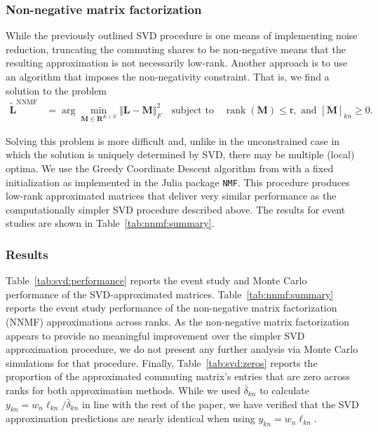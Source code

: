 \documentclass[11pt]{article}
\theoremstyle{definition}
\begin{document}
\subsubsection{Non-negative matrix factorization}\label{sec:appendix:nnmf}

While the previously outlined SVD procedure is one means of implementing noise reduction,
truncating the commuting shares to be non-negative means that the resulting approximation is not necessarily low-rank.
Another approach is to use an algorithm that imposes the non-negativity constraint.
That is, we find a solution to the problem 
\begin{equation}
\begin{split}
\label{eqn:svd:nnmf_approximation}
\tilde{\mathbf{L}}^\mathrm{NNMF} &= \operatorname*{arg} \min_{\mathbf{M}\in\mathbf{R}^{K\times N}} \Vert \mathbf{L} - \mathbf{M}\Vert^{2}_{F} \quad \text{subject to} \quad \operatorname*{rank}(\mathbf{M}) \leq \mathfrak{r}, \text{ and } \left[\mathbf{M}\right]_{kn} \geq 0.
\end{split}
\end{equation}


Solving this problem is more difficult and, unlike in the unconstrained case in which the solution is uniquely determined by SVD, there may be multiple (local) optima. 
We use the Greedy Coordinate Descent algorithm from  with a fixed initialization as implemented in the Julia package \texttt{NMF}.
This procedure produces low-rank approximated matrices that deliver very similar performance 
as the computationally simpler SVD procedure described above.
The results for event studies are shown in Table~\ref{tab:nnmf:summary}.


\subsubsection{Results}\label{sec:svd:results}

Table~\ref{tab:svd:performance} reports the event study and Monte Carlo performance of the SVD-approximated matrices.
Table~\ref{tab:nnmf:summary} reports the event study performance of the non-negative matrix factorization (NNMF) approximations across ranks.
As the non-negative matrix factorization appears to provide no meaningful improvement over the simpler SVD approximation procedure, we do not present any further analysis via Monte Carlo simulations for that procedure.
Finally, Table~\ref{tab:svd:zeros} reports the proportion of the approximated commuting matrix's entries that are zero across ranks for both approximation methods.
While we used $\bar{\delta}_{kn}$ to calculate $y_{kn} = w_n \ell_{kn} / \bar{\delta}_{kn}$ in line with the rest of the paper,
we have verified that the SVD approximation predictions are nearly identical when using $y_{kn} = w_n \ell_{kn}$.
\end{document}
